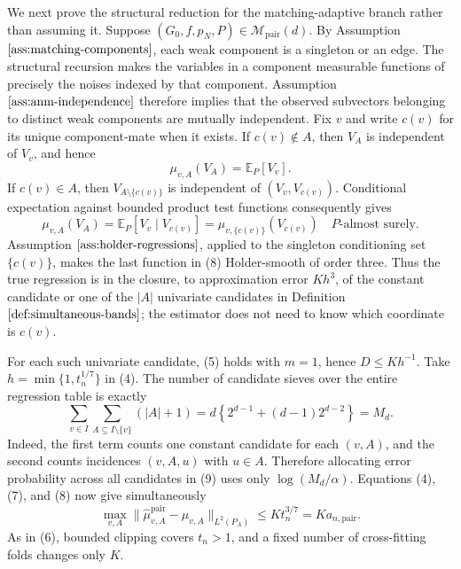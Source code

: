 We next prove the structural reduction for the matching-adaptive branch rather than assuming it. Suppose \((G_0,f,p_N,P)\in\mathcal M_{\mathrm{pair}}(d)\). By Assumption \(\ref{ass:matching-components}\), each weak component is a singleton or an edge. The structural recursion makes the variables in a component measurable functions of precisely the noises indexed by that component. Assumption \(\ref{ass:anm-independence}\) therefore implies that the observed subvectors belonging to distinct weak components are mutually independent. Fix \(v\) and write \(c(v)\) for its unique component-mate when it exists. If \(c(v)\notin A\), then \(V_A\) is independent of \(V_v\), and hence
\[
 \mu_{v,A}(V_A)=\mathbb E_P[V_v]. \tag{7}
\]
If \(c(v)\in A\), then \(V_{A\setminus\{c(v)\}}\) is independent of \((V_v,V_{c(v)})\). Conditional expectation against bounded product test functions consequently gives
\[
 \mu_{v,A}(V_A)
 =\mathbb E_P[V_v\mid V_{c(v)}]
 =\mu_{v,\{c(v)\}}(V_{c(v)})
 \quad P\text{-almost surely}. \tag{8}
\]
Assumption \(\ref{ass:holder-regressions}\), applied to the singleton conditioning set \(\{c(v)\}\), makes the last function in (8) Holder-smooth of order three. Thus the true regression is in the closure, to approximation error \(K h^3\), of the constant candidate or one of the \(|A|\) univariate candidates in Definition \(\ref{def:simultaneous-bands}\); the estimator does not need to know which coordinate is \(c(v)\).

For each such univariate candidate, (5) holds with \(m=1\), hence \(D\le K h^{-1}\). Take \(h=\min\{1,t_n^{1/7}\}\) in (4). The number of candidate sieves over the entire regression table is exactly
\[
 \sum_{v\in I}\sum_{A\subseteq I\setminus\{v\}}(|A|+1)
 =d\left\{2^{d-1}+(d-1)2^{d-2}\right\}=M_d. \tag{9}
\]
Indeed, the first term counts one constant candidate for each \((v,A)\), and the second counts incidences \((v,A,u)\) with \(u\in A\). Therefore allocating error probability across all candidates in (9) uses only \(\log(M_d/\alpha)\). Equations (4), (7), and (8) now give simultaneously
\[
 \max_{v,A}
 \lVert\widehat\mu^{\mathrm{pair}}_{v,A}-\mu_{v,A}\rVert_{L^2(P_A)}
 \le K t_n^{3/7}=K a_{n,\mathrm{pair}}. \tag{10}
\]
As in (6), bounded clipping covers \(t_n>1\), and a fixed number of cross-fitting folds changes only \(K\).

